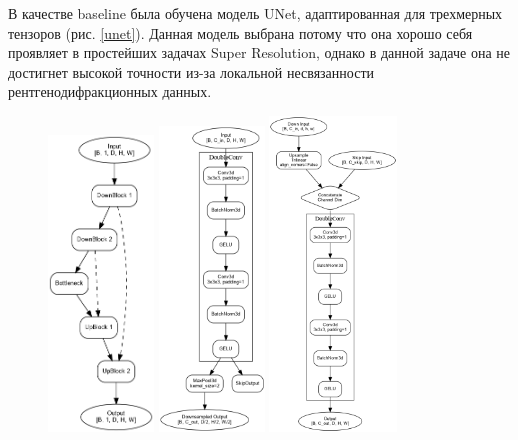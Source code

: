 В качестве baseline была обучена модель UNet, адаптированная для трехмерных тензоров (рис. \ref{unet}). Данная модель выбрана потому что она хорошо себя проявляет в простейших задачах Super Resolution, однако в данной задаче она не достигнет высокой точности из-за локальной несвязанности рентгенодифракционных данных. 

\begin{figure}[H]
    \centering
    \includegraphics[width=0.25\textwidth]{figures/mini_unet_architecture.png}
    \includegraphics[width=0.25\textwidth]{figures/downblock_architecture.png}
    \includegraphics[width=0.3\textwidth]{figures/upblock_architecture.png}

\end{figure}

